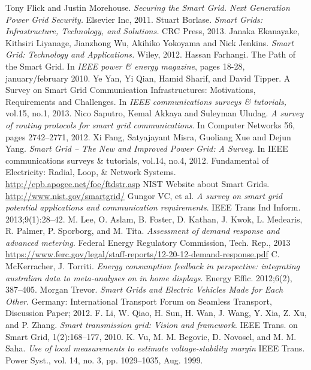 \documentclass[11pt,oneside]{book}
\begin{document}
\begin{thebibliography}{99}
 Tony Flick and Justin Morehouse. \emph{Securing the Smart Grid. Next Generation Power Grid Security.} Elsevier Inc, 2011.
 Stuart Borlase. \emph{Smart Grids: Infrastructure, Technology, and Solutions.} CRC Press, 2013.
 Janaka Ekanayake, Kithsiri Liyanage, Jianzhong Wu, Akihiko Yokoyama and Nick Jenkins. \emph{Smart Grid: Technology and Applications.} Wiley, 2012.
 Hassan Farhangi. The Path of the Smart Grid. In \emph{IEEE power \& energy magazine}, pages 18-28, january/february 2010.
 Ye Yan, Yi Qian, Hamid Sharif, and David Tipper. A Survey on Smart Grid Communication Infrastructures: Motivations, Requirements and Challenges. In \emph{IEEE communications surveys \& tutorials,} vol.15, no.1, 2013.
 Nico Saputro, Kemal Akkaya and Suleyman Uludag. \emph{A survey of routing protocols for smart grid communications}. In Computer Networks 56, pages 2742–2771, 2012.
 Xi Fang, Satyajayant Misra, Guoliang Xue and Dejun Yang. \emph{Smart Grid – The New and Improved Power Grid: A Survey}. In IEEE communications surveys \& tutorials, vol.14, no.4, 2012.
 Fundamental of Electricity: Radial, Loop, \& Network Systems. \url{http://epb.apogee.net/foe/ftdstr.asp}
 NIST Website about Smart Grids. \url{http://www.nist.gov/smartgrid/}
 Gungor VC, et al. \emph{A survey on smart grid potential applications and
communication requirements}. IEEE Trans Ind Inform. 2013;9(1):28–42.
 M. Lee, O. Aslam, B. Foster, D. Kathan, J. Kwok, L. Medearis,
R. Palmer, P. Sporborg, and M. Tita. \emph{Assessment of demand response
and advanced metering}. Federal Energy Regulatory Commission, Tech. Rep., 2013 \url{https://www.ferc.gov/legal/staff-reports/12-20-12-demand-response.pdf}
 C. McKerracher, J. Torriti. \emph{Energy consumption feedback in perspective: integrating australian data to meta-analyses on in home displays}. Energy Effic. 2012;6(2), 387–405.
 Morgan Trevor. \emph{Smart Grids and Electric Vehicles Made for Each Other}. Germany: International Transport Forum on Seamless Transport, Discussion Paper; 2012.
 F. Li, W. Qiao, H. Sun, H. Wan, J. Wang, Y. Xia, Z. Xu, and P. Zhang.
\emph{Smart transmission grid: Vision and framework}. IEEE Trans. on Smart Grid, 1(2):168–177, 2010.
 K. Vu, M. M. Begovic, D. Novosel, and M. M. Saha. \emph{Use of local measurements to estimate voltage-stability margin} IEEE Trans. Power Syst., vol. 14, no. 3, pp. 1029–1035, Aug. 1999. 

\end{thebibliography}
\end{document}
